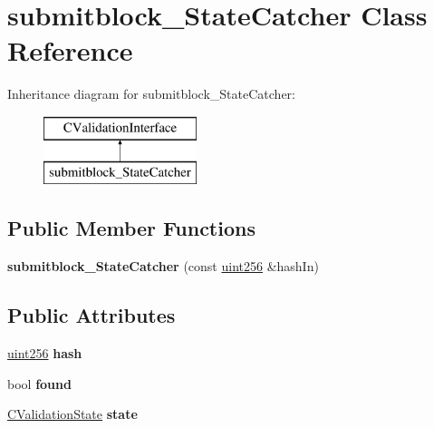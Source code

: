 \hypertarget{classsubmitblock___state_catcher}{}\section{submitblock\+\_\+\+State\+Catcher Class Reference}
\label{classsubmitblock___state_catcher}
Inheritance diagram for submitblock\+\_\+\+State\+Catcher\+:\begin{figure}[H]
\begin{center}
\leavevmode
\includegraphics[height=2.000000cm]{classsubmitblock___state_catcher}
\end{center}
\end{figure}
\subsection*{Public Member Functions}
\begin{DoxyCompactItemize}
\item 
\mbox{\label{classsubmitblock___state_catcher_a4751e652aed4193935ed00e95cfca548}} 
{\bfseries submitblock\+\_\+\+State\+Catcher} (const \mbox{\hyperlink{classuint256}{uint256}} \&hash\+In)
\end{DoxyCompactItemize}
\subsection*{Public Attributes}
\begin{DoxyCompactItemize}
\item 
\mbox{\label{classsubmitblock___state_catcher_adcc822af0b1305bcda71f8e9656c4239}} 
\mbox{\hyperlink{classuint256}{uint256}} {\bfseries hash}
\item 
\mbox{\label{classsubmitblock___state_catcher_a61c0d03544cd4495534bdb0b52f36886}} 
bool {\bfseries found}
\item 
\mbox{\label{classsubmitblock___state_catcher_a78357802ab8d143f6f21929e0aa2d727}} 
\mbox{\hyperlink{class_c_validation_state}{C\+Validation\+State}} {\bfseries state}
\end{DoxyCompactItemize}
